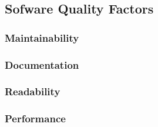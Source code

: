 
\subsection{Sofware Quality Factors}
\subsubsection{Maintainability}
\lipsum[1]
%

\subsubsection{Documentation}
\lipsum[2]

\subsubsection{Readability}
\lipsum[4]

\subsubsection{Performance}
\lipsum[5]